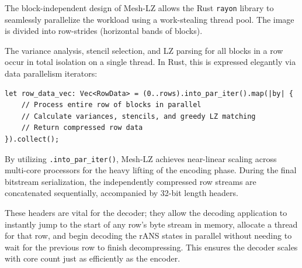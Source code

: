 The block-independent design of Mesh-LZ allows the Rust \texttt{rayon} library to seamlessly parallelize the workload using a work-stealing thread pool. The image is divided into row-strides (horizontal bands of blocks). 

The variance analysis, stencil selection, and LZ parsing for all blocks in a row occur in total isolation on a single thread. In Rust, this is expressed elegantly via data parallelism iterators:

\begin{verbatim}
let row_data_vec: Vec<RowData> = (0..rows).into_par_iter().map(|by| {
    // Process entire row of blocks in parallel
    // Calculate variances, stencils, and greedy LZ matching
    // Return compressed row data
}).collect();
\end{verbatim}

By utilizing \texttt{.into\_par\_iter()}, Mesh-LZ achieves near-linear scaling across multi-core processors for the heavy lifting of the encoding phase. During the final bitstream serialization, the independently compressed row streams are concatenated sequentially, accompanied by 32-bit length headers. 

These headers are vital for the decoder; they allow the decoding application to instantly jump to the start of any row's byte stream in memory, allocate a thread for that row, and begin decoding the rANS states in parallel without needing to wait for the previous row to finish decompressing. This ensures the decoder scales with core count just as efficiently as the encoder.
